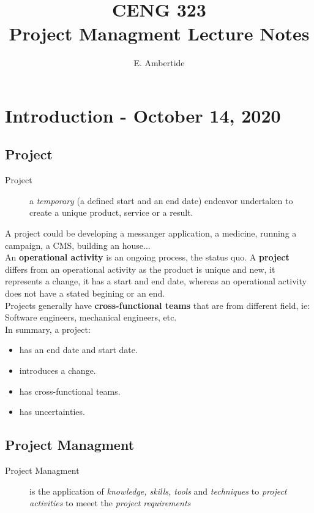 \documentclass[11pt,a4paper,twocolumn]{book}
\author{E. Ambertide}
\title{\textbf{CENG 323} \\ \large{Project Managment Lecture Notes}}
\begin{document}
\maketitle

\chapter{Introduction - October 14, 2020}

\section{Project}

\begin{description}
\item[Project] a \textit{temporary} (a defined start and an end date) endeavor undertaken to create a unique product, service or a result.
\end{description}

A project could be developing a messanger application, a medicine, running a campaign, a CMS, building an house...\\

An \textbf{operational activity} is an ongoing process, the status quo. A \textbf{project} differs from an operational activity as the product is unique and new, it represents a change, it has a start and end date, whereas an operational activity does not have a stated begining or an end.\\

Projects generally have \textbf{cross-functional teams} that are from different field, ie: Software engineers, mechanical engineers, etc.\\

In summary, a project:

\begin{itemize}
\item has an end date and start date.
\item introduces a change.
\item has cross-functional teams.
\item has uncertainties.
\end{itemize}

\section{Project Managment}

\begin{description}
\item[Project Managment] is the application of \textit{knowledge, skills, tools} and \textit{techniques} to \textit{project activities} to meeet the \textit{project requirements}
\end{description}
\end{document}
